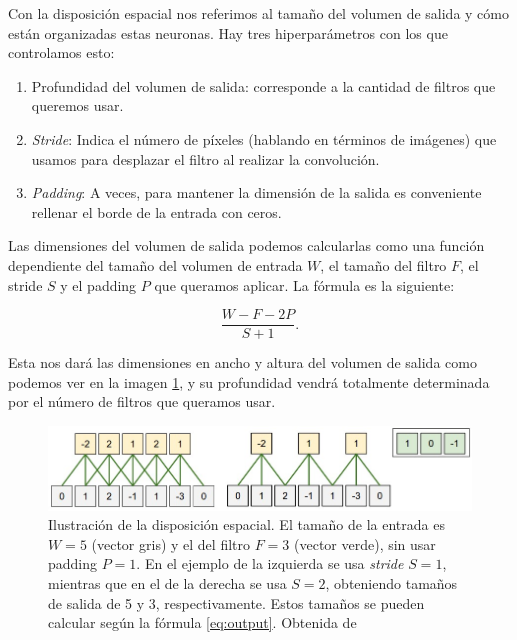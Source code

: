 Con la disposición espacial nos referimos al tamaño del volumen de salida y cómo están organizadas estas neuronas. Hay tres hiperparámetros con los que controlamos esto:

\begin{enumerate}

	\item Profundidad del volumen de salida: corresponde a la cantidad de filtros que queremos usar.
	
	\item \textit{Stride}: Indica el número de píxeles (hablando en términos de imágenes) que usamos para desplazar el filtro al realizar la convolución.
	
	\item \textit{Padding}: A veces, para mantener la dimensión de la salida es conveniente rellenar el borde de la entrada con ceros.

\end{enumerate}


Las dimensiones del volumen de salida podemos calcularlas como una función dependiente del tamaño del volumen de entrada $W$, el tamaño del filtro $F$, el stride $S$ y el padding $P$ que queramos aplicar. La fórmula es la siguiente:

\begin{equation}\label{eq:output}
\frac{W-F-2P}{S+1}.
\end{equation}

Esta nos dará las dimensiones en ancho y altura del volumen de salida como podemos ver en la imagen \ref{fig:stride}, y su profundidad vendrá totalmente determinada por el número de filtros que queramos usar.

\begin{figure}
    \centering
    \includegraphics[width=0.75\linewidth]{Plantilla_TFG_latex//imagenes//Inf//2.Fund/2.stride.jpeg}
    \caption{Ilustración de la disposición espacial. El tamaño de la entrada es $W=5$ (vector gris) y el del filtro $F=3$ (vector verde), sin usar padding $P=1$. En el ejemplo de la izquierda se usa \textit{stride} $S=1$, mientras que en el de la derecha se usa $S=2$, obteniendo tamaños de salida de 5 y 3, respectivamente. Estos tamaños se pueden calcular según la fórmula \ref{eq:output}. Obtenida de \cite{stanford_231}}
    \label{fig:stride}
\end{figure}


